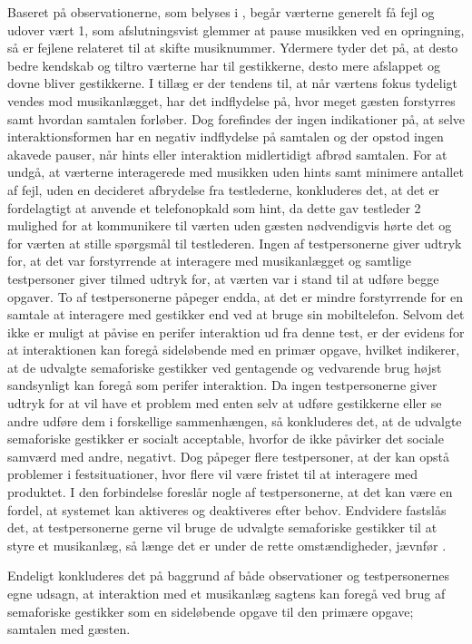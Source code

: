 Baseret på observationerne, som belyses i , begår værterne generelt få fejl og udover vært 1, som afslutningsvist glemmer at pause musikken ved en opringning, så er fejlene relateret til at skifte musiknummer. Ydermere tyder det på, at desto bedre kendskab og tiltro værterne har til gestikkerne, desto mere afslappet og dovne bliver gestikkerne. I tillæg er der tendens til, at når værtens fokus tydeligt vendes mod musikanlægget, har det indflydelse på, hvor meget gæsten forstyrres samt hvordan samtalen forløber. Dog forefindes der ingen indikationer på, at selve interaktionsformen har en negativ indflydelse på samtalen og der opstod ingen akavede pauser, når hints eller interaktion midlertidigt afbrød samtalen. For at undgå, at værterne interagerede med musikken uden hints samt minimere antallet af fejl, uden en decideret afbrydelse fra testlederne, konkluderes det, at det er fordelagtigt at anvende et telefonopkald som hint, da dette gav testleder 2 mulighed for at kommunikere til værten uden gæsten nødvendigvis hørte det og for værten at stille spørgsmål til testlederen.\blankline
%
Ingen af testpersonerne giver udtryk for, at det var forstyrrende at interagere med musikanlægget og samtlige testpersoner giver tilmed udtryk for, at værten var i stand til at udføre begge opgaver. To af testpersonerne påpeger endda, at det er mindre forstyrrende for en samtale at interagere med gestikker end ved at bruge sin mobiltelefon. Selvom det ikke er muligt at påvise en perifer interaktion ud fra denne test, er der evidens for at interaktionen kan foregå sideløbende med en primær opgave, hvilket indikerer, at de udvalgte semaforiske gestikker ved gentagende og vedvarende brug højst sandsynligt kan foregå som perifer interaktion. \blankline
%
Da ingen testpersonerne giver udtryk for at vil have et problem med enten selv at udføre gestikkerne eller se andre udføre dem i forskellige sammenhængen, så konkluderes det, at de udvalgte semaforiske gestikker er socialt acceptable, hvorfor de ikke påvirker det sociale samværd med andre, negativt. Dog påpeger flere testpersoner, at der kan opstå problemer i festsituationer, hvor flere vil være fristet til at interagere med produktet. I den forbindelse foreslår nogle af testpersonerne, at det kan være en fordel, at systemet kan aktiveres og deaktiveres efter behov. Endvidere fastslås det, at testpersonerne gerne vil bruge de udvalgte semaforiske gestikker til at styre et musikanlæg, så længe det er under de rette omstændigheder, jævnfør .  

Endeligt konkluderes det på baggrund af både observationer og testpersonernes egne udsagn, at interaktion med et musikanlæg sagtens kan foregå ved brug af semaforiske gestikker som en sideløbende opgave til den primære opgave; samtalen med gæsten.



